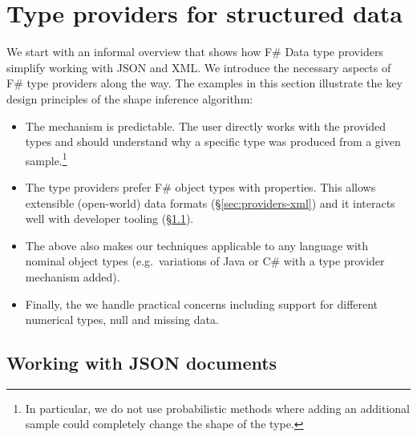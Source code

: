 \documentclass[10pt,preprint,blind,clearpagebib]{sigplanconf}
\newcommand{\kvd}[1]{\textnormal{\textcolor{kvdclr}{\sffamily #1}}}
\begin{document}
\section{Type providers for structured data}
\label{sec:providers}

We start with an informal overview that shows how F\# Data type providers simplify working with 
JSON and XML. We introduce the necessary aspects of F\# type providers along the way. The examples 
in this section illustrate the key design principles of the shape inference algorithm:

\begin{itemize}
\item The mechanism is predictable. The user directly works with the provided types and should 
  understand why a specific type was produced from a given sample.\footnote{In particular, we do 
  not use probabilistic methods where adding an additional sample could completely change the 
  shape of the type.}

\item The type providers prefer F\# object types with properties. This allows extensible 
  (open-world) data formats (\S\ref{sec:providers-xml}) and it interacts well with developer tooling
  (\S\ref{sec:providers-json}). 

\item The above also makes our techniques applicable to any language with nominal 
  object types (e.g.~variations of Java or C\# with a type provider mechanism added).

\item Finally, the we handle practical concerns including
  support for different numerical types, \kvd{null} and missing data.
\end{itemize}


\subsection{Working with JSON documents}
\label{sec:providers-json}
\end{document}
